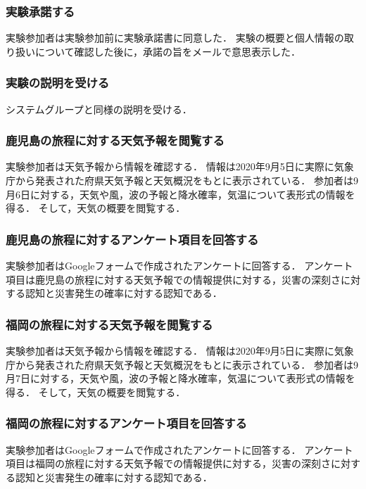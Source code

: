 \subsubsection {実験承諾する}
実験参加者は実験参加前に実験承諾書に同意した．
実験の概要と個人情報の取り扱いについて確認した後に，承諾の旨をメールで意思表示した．

\subsubsection {実験の説明を受ける}
システムグループと同様の説明を受ける．

\subsubsection {鹿児島の旅程に対する天気予報を閲覧する}
実験参加者は天気予報から情報を確認する．
情報は2020年9月5日に実際に気象庁から発表された府県天気予報と天気概況をもとに表示されている．
参加者は9月6日に対する，天気や風，波の予報と降水確率，気温について表形式の情報を得る．
そして，天気の概要を閲覧する．

\subsubsection {鹿児島の旅程に対するアンケート項目を回答する}
実験参加者はGoogleフォームで作成されたアンケートに回答する．
アンケート項目は鹿児島の旅程に対する天気予報での情報提供に対する，災害の深刻さに対する認知と災害発生の確率に対する認知である．

\subsubsection {福岡の旅程に対する天気予報を閲覧する}
実験参加者は天気予報から情報を確認する．
情報は2020年9月5日に実際に気象庁から発表された府県天気予報と天気概況をもとに表示されている．
参加者は9月7日に対する，天気や風，波の予報と降水確率，気温について表形式の情報を得る．
そして，天気の概要を閲覧する．

\subsubsection {福岡の旅程に対するアンケート項目を回答する}
実験参加者はGoogleフォームで作成されたアンケートに回答する．
アンケート項目は福岡の旅程に対する天気予報での情報提供に対する，災害の深刻さに対する認知と災害発生の確率に対する認知である．